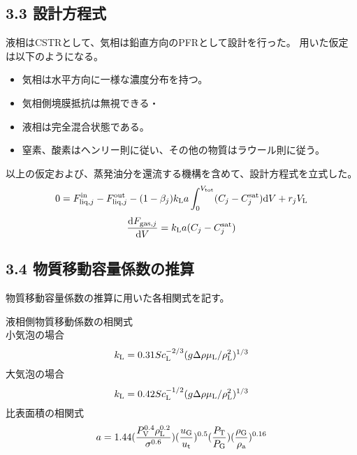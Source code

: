 \documentclass[a4j]{jsarticle}
\begin{document}
\subsection*{3.3 設計方程式}
液相はCSTRとして、気相は鉛直方向のPFRとして設計を行った。
用いた仮定は以下のようになる。
\begin{itemize} 
    \item 気相は水平方向に一様な濃度分布を持つ。\\
    \item 気相側境膜抵抗は無視できる・\\
    \item 液相は完全混合状態である。\\
    \item 窒素、酸素はヘンリー則に従い、その他の物質はラウール則に従う。
\end{itemize}
以上の仮定および、蒸発油分を還流する機構を含めて、設計方程式を立式した。\\
\begin{equation}\nonumber
    0=F^{{\rm in}}_{{\rm liq},j}-F^{{\rm out}}_{{\rm liq},j} -(1-\beta_j) k_{{\rm L}}a
    \int^{V_{{\rm tot}}}_0(C_j - C^{{\rm sat}}_j){\rm d}V + r_j V_{{\rm L}}
\end{equation}
\begin{equation}\nonumber                                                
    \frac{{\rm d}F_{{\rm gas},j}}{{\rm d}V} = k_{{\rm L}}a(C_j - C^{{\rm sat}}_j)
\end{equation}

\subsection*{3.4 物質移動容量係数の推算}
物質移動容量係数の推算に用いた各相関式を記す。

液相側物質移動係数の相関式\\
小気泡の場合
\begin{equation}
    k_{{\rm L}} = 0.31Sc_{{\rm L}}^{-2/3}(g \Delta \rho \mu_{{\rm L}}/\rho_{{\rm L}}^2)^{1/3}
\end{equation}
大気泡の場合
\begin{equation}
    k_{{\rm L}} = 0.42Sc_{{\rm L}}^{-1/2}(g \Delta \rho \mu_{{\rm L}}/\rho_{{\rm L}}^2)^{1/3}
\end{equation}
比表面積の相関式
\begin{equation}
    a = 1.44(\frac{P_{{\rm V}}^{0.4} \rho_{{\rm L}}^{0.2} }{ \sigma^{0.6}})(\frac{u_{{\rm G}}}{u_{{\rm t}}})^{0.5}(\frac{P_{{\rm T}}}{P_{{\rm G}}})(\frac{\rho_{{\rm G}}}{\rho_{{\rm a}}})^{0.16}
\end{equation}
\end{document}
